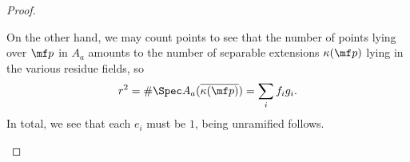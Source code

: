 \documentclass[../notes.tex]{subfiles}
\begin{document}
\begin{proof}
\begin{enumerate}
		On the other hand, we may count points to see that the number of points lying over $\mf p$ in $A_a$ amounts to the number of separable extensions $\kappa(\mf p)$ lying in the various residue fields, so
		\[r^2=\#\Spec A_a(\overline{\kappa(\mf p)})=\sum_if_ig_i.\]
		In total, we see that each $e_i$ must be $1$, being unramified follows.
		\qedhere
	\end{enumerate}
\end{proof}
\end{document}
